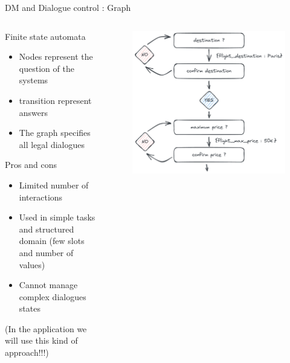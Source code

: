 \documentclass[10pt,aspectratio=169]{beamer}
\begin{document}
\begin{frame}{DM and Dialogue control : Graph}
    \begin{columns}
        \begin{column}{0.5\textwidth}
            \begin{block}{Finite state automata}
                \begin{itemize}
                    \item Nodes represent the question of the systems
                    \item transition represent answers
                    \item The graph specifies all legal dialogues
                \end{itemize}
            \end{block}
            \begin{block}{Pros and cons}
                \begin{itemize}
                    \item Limited number of interactions
                    \item Used in  simple tasks and structured domain (few slots and number of values)
                    \item Cannot manage complex dialogues states
                \end{itemize}
                (In the application we will use this kind of approach!!!)
            \end{block}
        \end{column}
        \begin{column}{0.5\textwidth}
            \begin{figure}
                \centering
                \includegraphics[width=1.\textwidth]{media/automata.png}
            \end{figure}
        \end{column}
    \end{columns}
    

\end{frame}
\end{document}
